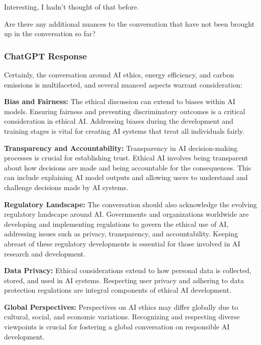 Interesting, I hadn't thought of that before.

Are there any additional nuances to the conversation that have not been brought up in the conversation so far?

\subsubsection{ChatGPT Response}

Certainly, the conversation around AI ethics, energy efficiency, and carbon emissions is multifaceted, and several nuanced aspects warrant consideration:

\begin{enumarabic}
  \item \textbf{Bias and Fairness:} The ethical discussion can extend to biases within AI models. Ensuring fairness and preventing discriminatory outcomes is a critical consideration in ethical AI. Addressing biases during the development and training stages is vital for creating AI systems that treat all individuals fairly.
  
  \item \textbf{Transparency and Accountability:} Transparency in AI decision-making processes is crucial for establishing trust. Ethical AI involves being transparent about how decisions are made and being accountable for the consequences. This can include explaining AI model outputs and allowing users to understand and challenge decisions made by AI systems.
  
  \item \textbf{Regulatory Landscape:} The conversation should also acknowledge the evolving regulatory landscape around AI. Governments and organizations worldwide are developing and implementing regulations to govern the ethical use of AI, addressing issues such as privacy, transparency, and accountability. Keeping abreast of these regulatory developments is essential for those involved in AI research and development.
  
  \item \textbf{Data Privacy:} Ethical considerations extend to how personal data is collected, stored, and used in AI systems. Respecting user privacy and adhering to data protection regulations are integral components of ethical AI development.
  
  \item \textbf{Global Perspectives:} Perspectives on AI ethics may differ globally due to cultural, social, and economic variations. Recognizing and respecting diverse viewpoints is crucial for fostering a global conversation on responsible AI development.
  

\end{enumarabic}
